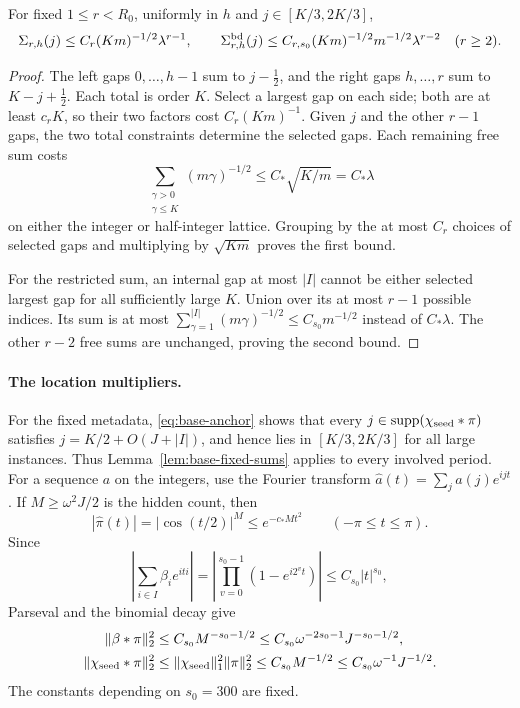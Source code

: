 \begin{lemma}\label{lem:base-fixed-sums}
For fixed \(1\le r<R_0\), uniformly in \(h\) and
\(j\in[K/3,2K/3]\),
\begin{equation}\label{eq:base-fixed-sums}
 \Sigma_{r,h}(j)\le C_r(Km)^{-1/2}\lambda^{r-1},\qquad
 \Sigma_{r,h}^{\rm bd}(j)
 \le C_{r,s_0}(Km)^{-1/2}m^{-1/2}\lambda^{r-2}\quad(r\ge2).
\end{equation}
\end{lemma}

\begin{proof}
The left gaps \(0,\ldots,h-1\) sum to \(j-\tfrac12\), and the right gaps \(h,\ldots,r\) sum to \(K-j+\tfrac12\). Each total is order \(K\). Select a largest gap on each side; both are at least \(c_rK\), so their two factors cost \(C_r(Km)^{-1}\). Given \(j\) and the other \(r-1\) gaps, the two total constraints determine the selected gaps. Each remaining free sum costs
\[
 \sum_{\substack{\gamma>0\\\gamma\le K}}(m\gamma)^{-1/2}
 \le C_*\sqrt{K/m}=C_*\lambda
\]
on either the integer or half-integer lattice. Grouping by the at most \(C_r\) choices of selected gaps and multiplying by \(\sqrt{Km}\) proves the first bound.

For the restricted sum, an internal gap at most \(|I|\) cannot be either selected largest gap for all sufficiently large \(K\). Union over its at most \(r-1\) possible indices. Its sum is at most
\(\sum_{\gamma=1}^{|I|}(m\gamma)^{-1/2}\le C_{s_0} m^{-1/2}\)
instead of \(C_*\lambda\). The other \(r-2\) free sums are unchanged, proving the second bound.
\end{proof}

\paragraph{The location multipliers.}
For the fixed metadata, \eqref{eq:base-anchor} shows that every
\(j\in\operatorname{supp}(\chi_{\rm seed}*\pi)\) satisfies
\(j=K/2+O(J+|I|)\), and hence lies in \([K/3,2K/3]\) for all large instances. Thus Lemma~\ref{lem:base-fixed-sums} applies to every involved period. For a sequence \(a\) on the integers, use the Fourier transform
\(\widehat a(t)=\sum_j a(j)e^{ijt}\). If \(M\ge\omega^2J/2\) is the hidden count, then
\[
 |\widehat\pi(t)|=|\cos(t/2)|^M\le e^{-c_*Mt^2}
 \qquad(-\pi\le t\le\pi).
\]
Since
\[
 \left|\sum_{i\in I}\beta_i e^{iti}\right|
 =\left|\prod_{v=0}^{s_0-1}(1-e^{i2^v t})\right|
 \le C_{s_0}|t|^{s_0},
\]
Parseval and the binomial decay give
\begin{equation}\label{eq:base-multiplier-norms}
\begin{aligned}
 \|\beta*\pi\|_2^2
 &\le C_{s_0} M^{-s_0-1/2}
 \le C_{s_0}\omega^{-2s_0-1}J^{-s_0-1/2},\\
 \|\chi_{\rm seed}*\pi\|_2^2
 &\le \|\chi_{\rm seed}\|_1^2\|\pi\|_2^2
 \le C_{s_0} M^{-1/2}
 \le C_{s_0}\omega^{-1}J^{-1/2}.
\end{aligned}
\end{equation}
The constants depending on \(s_0=300\) are fixed.

